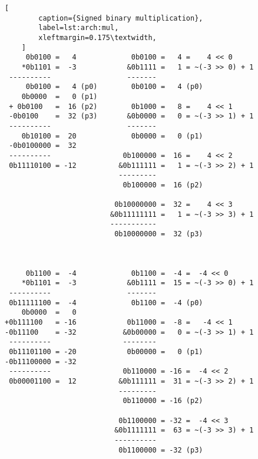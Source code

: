 \begin{figure}[p]
    \begin{lstlisting}[
        caption={Signed binary multiplication},
        label=lst:arch:mul,
        xleftmargin=0.175\textwidth,
    ]
     0b0100 =   4             0b0100 =   4 =    4 << 0
    *0b1101 =  -3            &0b1111 =   1 = ~(-3 >> 0) + 1
 ----------                  -------
     0b0100 =   4 (p0)        0b0100 =   4 (p0)
    0b0000  =   0 (p1)
 + 0b0100   =  16 (p2)        0b1000 =   8 =    4 << 1
 -0b0100    =  32 (p3)       &0b0000 =   0 = ~(-3 >> 1) + 1
 ----------                  -------
    0b10100 =  20             0b0000 =   0 (p1)
 -0b0100000 =  32
 ----------                 0b100000 =  16 =    4 << 2
 0b11110100 = -12          &0b111111 =   1 = ~(-3 >> 2) + 1
                           ---------
                            0b100000 =  16 (p2)

                          0b10000000 =  32 =    4 << 3
                         &0b11111111 =   1 = ~(-3 >> 3) + 1
                         -----------
                          0b10000000 =  32 (p3)



     0b1100 =  -4             0b1100 =  -4 =  -4 << 0
    *0b1101 =  -3            &0b1111 =  15 = ~(-3 >> 0) + 1
 ----------                  -------
 0b11111100 =  -4             0b1100 =  -4 (p0)
    0b0000  =   0
+0b111100   = -16            0b11000 =  -8 =   -4 << 1
-0b11100    = -32           &0b00000 =   0 = ~(-3 >> 1) + 1
 ----------                 --------
 0b11101100 = -20            0b00000 =   0 (p1)
-0b11100000 = -32
 ----------                 0b110000 = -16 =  -4 << 2
 0b00001100 =  12          &0b111111 =  31 = ~(-3 >> 2) + 1
                           ---------
                            0b110000 = -16 (p2)

                           0b1100000 = -32 =  -4 << 3
                          &0b1111111 =  63 = ~(-3 >> 3) + 1
                          ----------
                           0b1100000 = -32 (p3)
    \end{lstlisting}
\end{figure}
